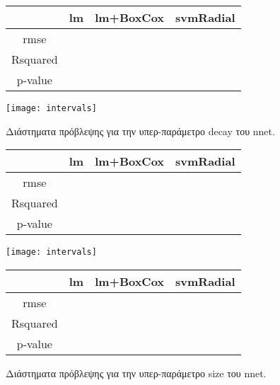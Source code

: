\begin{figure}[H]
\begin{minipage}{0.48\textwidth}
\begin{center}
		\begin{tabular}{ |c|c|c|c| } 
			\hline
			& lm & lm+BoxCox & svmRadial\\
			\hline
			rmse & & &\\
			\hline
			Rsquared & & & \\
			\hline 
			p-value & & &\\				
			\hline
		\end{tabular}   
	\end{center}
\end{minipage} \qquad
\begin{minipage}{0.48\textwidth}
	\centering
	\texttt{[image: intervals]}
	\caption{Διάστηματα πρόβλεψης για την υπερ-παράμετρο decay του nnet.}	
\end{minipage}
\begin{minipage}{0.48\textwidth}
	\noindent
	\begin{center}
		\begin{tabular}{ |c|c|c|c| } 
			\hline
			& lm & lm+BoxCox & svmRadial\\
			\hline
			rmse & & &\\
			\hline
			Rsquared & & & \\
			\hline 
			p-value & & &\\				
			\hline
		\end{tabular}   
	\end{center}
\end{minipage} \qquad
\begin{minipage}{0.48\textwidth}
	\centering
	\texttt{[image: intervals]}
	\caption{Διάστηματα πρόβλεψης για την υπερ-παράμετρο size του nnet.}	
\end{minipage}
\begin{minipage}{0.48\textwidth}
	\noindent
	\begin{center}
		\begin{tabular}{ |c|c|c|c| } 
			\hline
			& lm & lm+BoxCox & svmRadial\\
			\hline
			rmse & & &\\
			\hline
			Rsquared & & & \\
			\hline 
			p-value & & &\\				
			\hline
		\end{tabular}   
	\end{center}
\end{minipage} \qquad

\end{figure}
